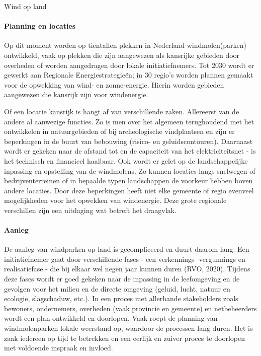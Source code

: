 \begin{voorstel}{Wind op land}
\begin{overwegingen}
\paragraph{Planning en locaties}
Op dit moment worden op tientallen plekken in Nederland windmolen(parken) ontwikkeld, vaak op plekken die zijn aangewezen als kansrijke gebieden door overheden of worden aangedragen door lokale initiatiefnemers. Tot 2030 wordt er gewerkt aan Regionale Energiestrategieën; in 30 regio’s worden plannen gemaakt voor de opwekking van wind- en zonne-energie. Hierin worden gebieden aangewezen die kansrijk zijn voor windenergie.

Of een locatie kansrijk is hangt af van verschillende zaken. Allereerst van de andere al aanwezige functies. Zo is men over het algemeen terughoudend met het ontwikkelen in natuurgebieden of bij archeologische vindplaatsen en zijn er beperkingen in de buurt van bebouwing (risico- en geluidscontouren). Daarnaast wordt er gekeken naar de afstand tot en de capaciteit van het elektriciteitsnet - is het technisch en financieel haalbaar. Ook wordt er gelet op de landschappelijke inpassing en opstelling van de windmolens. Zo kunnen locaties langs snelwegen of bedrijventerreinen of in bepaalde typen landschappen de voorkeur hebben boven andere locaties. Door deze beperkingen heeft niet elke gemeente of regio evenveel mogelijkheden voor het opwekken van windenergie. Deze grote regionale verschillen zijn een uitdaging wat betreft het draagvlak.\

\paragraph{Aanleg}
De aanleg van windparken op land is gecompliceerd en duurt daarom lang. Een initiatiefnemer gaat door verschillende fases - een verkennings- vergunnings en realisatiefase - die bij elkaar wel negen jaar kunnen duren (RVO, 2020). Tijdens deze fases wordt er goed gekeken naar de inpassing in de leefomgeving en de gevolgen voor het milieu en de directe omgeving (geluid, lucht, natuur en ecologie, slagschaduw, etc.). In een proces met allerhande stakeholders zoals bewoners, ondernemers, overheden (vaak provincie en gemeente) en netbeheerders wordt een plan ontwikkeld en doorlopen. Vaak roept de planning van windmolenparken lokale weerstand op, waardoor de processen lang duren. Het is zaak iedereen op tijd te betrekken en een eerlijk en zuiver proces te doorlopen met voldoende inspraak en invloed.


\end{overwegingen}
\end{voorstel}

